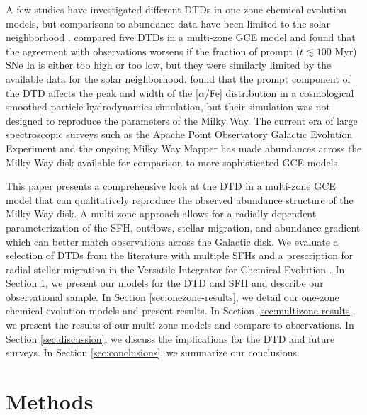 \documentclass[twocolumn,twocolappendix]{aastex631}
\newcommand{\aFe}{[$\alpha$/Fe]\xspace}
\newcommand{\vice}{{\tt VICE}\xspace}
\begin{document}
A few studies have investigated different DTDs in one-zone chemical evolution models, but comparisons to abundance data have been limited to the solar neighborhood \citep[e.g.,][]{Andrews2017-ChemicalEvolution,Palicio2023-AnalyticDTD}. \citet{Matteucci2009-DTDModels} compared five DTDs in a multi-zone GCE model and found that the agreement with observations worsens if the fraction of prompt ($t\lesssim 100$ Myr) SNe Ia is either too high or too low, but they were similarly limited by the available data for the solar neighborhood. \citet{Poulhazan2018-PrecisionPollution} found that the prompt component of the DTD affects the peak and width of the \aFe distribution in a cosmological smoothed-particle hydrodynamics simulation, but their simulation was not designed to reproduce the parameters of the Milky Way. The current era of large spectroscopic surveys such as the Apache Point Observatory Galactic Evolution Experiment \citep[APOGEE;][]{Majewski2017-APOGEE} and the ongoing Milky Way Mapper \citep{Kollmeier2017-SDSS-V} has made abundances across the Milky Way disk available for comparison to more sophisticated GCE models.

This paper presents a comprehensive look at the DTD in a multi-zone GCE model that can qualitatively reproduce the observed abundance structure of the Milky Way disk. A multi-zone approach allows for a radially-dependent parameterization of the SFH, outflows, stellar migration, and abundance gradient which can better match observations across the Galactic disk. We evaluate a selection of DTDs from the literature with multiple SFHs and a prescription for radial stellar migration in the Versatile Integrator for Chemical Evolution \citep[\vice;][]{JohnsonWeinberg2020-Starbursts}. In Section \ref{sec:methods}, we present our models for the DTD and SFH and describe our observational sample. In Section \ref{sec:onezone-results}, we detail our one-zone chemical evolution models and present results. In Section \ref{sec:multizone-results}, we present the results of our multi-zone models and compare to observations. In Section \ref{sec:discussion}, we discuss the implications for the DTD and future surveys. In Section \ref{sec:conclusions}, we summarize our conclusions.

\section{Methods}
\label{sec:methods}
\end{document}
